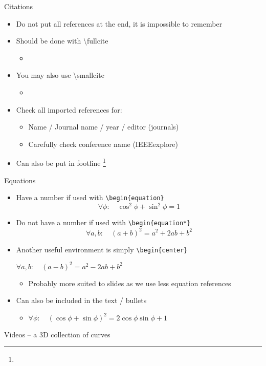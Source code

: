 \documentclass{thesisbeamer}
\begin{document}
\begin{frame}{Citations}
 \begin{itemize}[<+->]
  \item Do not put all references at the end, it is impossible to remember \vfill
  \item Should be done with \textbackslash{fullcite}
  \begin{itemize}[<.->]
   \item {}
  \end{itemize}\vfill
  \item You may also use \textbackslash{smallcite}
  \begin{itemize}[<.->]
   \item {}
  \end{itemize}\vfill
  \item Check all imported references for:
  \begin{itemize}[<.->]
   \item Name / Journal name / year / editor (journals)
   \item Carefully check conference name (IEEEexplore)
  \end{itemize}\vfill
  \item Can also be put in footline \footnote{}
 \end{itemize}
\end{frame}

\begin{frame}{Equations}
\begin{itemize}[<+->]
  \item Have a number if used with \texttt{\textbackslash{begin}\{equation\}}
  \begin{equation}
  \forall \phi: \quad \cos ^2 \phi + \sin^2\phi = 1
  \end{equation}\vfill
  \item Do not have a number if used with \texttt{\textbackslash{begin}\{equation*\}}
    \begin{equation*}
  \forall a, b: \quad (a+b)^2 = a^2 + 2ab + b^2
  \end{equation*}
    \item Another useful environment is simply  \texttt{\textbackslash{begin}\{center\}}
    \begin{center}
    $\forall a, b: \quad (a-b)^2 = a^2 - 2ab + b^2$
    \end{center}
    \begin{itemize}[<+->]
    \item Probably more suited to slides as we use less equation references
  \end{itemize} \vfill\vfill   
  \item Can also be included in the text / bullets
  \begin{itemize}[<+->]
    \item $\forall \phi: \quad  (\cos\phi+\sin\phi)^2 = 2\cos\phi\sin\phi + 1$
  \end{itemize}
\end{itemize}
\end{frame}

\begin{frame}{Videos -- a 3D collection of curves}
\begin{center}
\end{center}
\end{frame}
\end{document}

